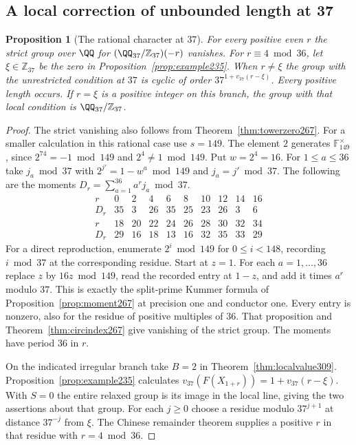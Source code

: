 \documentclass[a4paper,11pt]{article}
\newtheorem{proposition}{Proposition}[section]
\theoremstyle{definition}
\theoremstyle{remark}
\newcommand{\ZZ}{\mathbb Z}\newcommand{\ord}{\operatorname{ord}}
\numberwithin{equation}{section}
\begin{document}
\subsection{A local correction of unbounded length at 37}\label{nav:III-71}
\begin{proposition}[The rational character at \(37\)]\leavevmode
\label{prop:rational37exact309}
For every positive even \(r\) the strict group over \(\QQ\)
for \((\QQ_{37}/\ZZ_{37})(-r)\) vanishes. For
\(r\equiv4\bmod36\), let \(\xi\in\ZZ_{37}\) be the zero in
Proposition~\ref{prop:example235}. When \(r\ne\xi\) the group
with the unrestricted condition at \(37\) is cyclic of order
\(37^{1+v_{37}(r-\xi)}\). Every positive length occurs.
If \(r=\xi\) is a positive integer on this branch, the group
with that local condition is \(\QQ_{37}/\ZZ_{37}\).
\end{proposition}
\begin{proof}
The strict vanishing also follows from Theorem~\ref{thm:towerzero267}.
For a smaller calculation in this rational case use \(s=149\).
The element \(2\) generates \(\mathbb F_{149}^\times\), since
\(2^{74}=-1\bmod149\) and \(2^4\ne1\bmod149\). Put \(w=2^4=16\).
For \(1\le a\le36\) take \(j_a\bmod37\) with
\(2^{j'}=1-w^a\bmod149\) and \(j_a=j'\bmod37\).
The following are the moments
\(D_r=\sum_{a=1}^{36}a^r j_a\bmod37\).
\[
\begin{array}{c|rrrrrrrrr}
 r&0&2&4&6&8&10&12&14&16\\ \hline
 D_r&35&3&26&35&25&23&26&3&6\\[2pt]
 r&18&20&22&24&26&28&30&32&34\\ \hline
 D_r&29&16&18&13&16&32&35&33&29
\end{array}
\]
For a direct reproduction, enumerate \(2^i\bmod149\) for
\(0\le i<148\), recording \(i\bmod37\) at the corresponding
residue. Start at \(z=1\). For each \(a=1,\ldots,36\) replace
\(z\) by \(16z\bmod149\), read the recorded entry at \(1-z\),
and add it times \(a^r\) modulo \(37\). This is exactly the
split-prime Kummer formula of Proposition~\ref{prop:moment267}
at precision one and conductor one. Every entry is nonzero,
also for the residue of positive multiples of \(36\). That
proposition and Theorem~\ref{thm:circindex267} give vanishing
of the strict group. The moments have period \(36\) in \(r\).

On the indicated irregular branch take \(B=2\) in
Theorem~\ref{thm:localvalue309}. Proposition~\ref{prop:example235}
calculates \(v_{37}(F(X_{1+r}))=1+v_{37}(r-\xi)\).
With \(S=0\) the entire relaxed group is its image in the local
line, giving the two assertions about that group. For each
\(j\ge0\) choose a residue modulo \(37^{j+1}\) at distance
\(37^{-j}\) from \(\xi\). The Chinese remainder theorem supplies
a positive \(r\) in that residue with \(r=4\bmod36\).
\end{proof}
\end{document}
